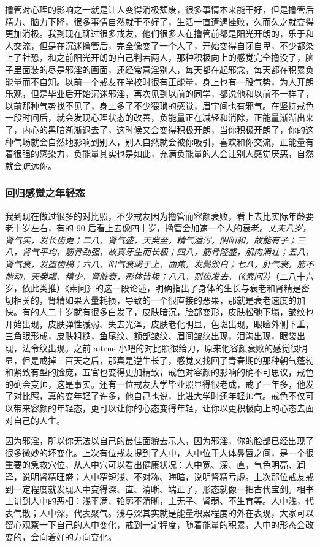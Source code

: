 撸管对心理的影响之一就是让人变得消极颓废，很多事情本来能干好，但是撸管后精力、脑力下降，很多事情自然就干不好了，生活一直遭遇挫败，久而久之就变得更加消极。我到现在聊过很多戒友，他们很多人在撸管前都是阳光开朗的，乐于和人交流，但是在沉迷撸管后，完全像变了一个人了，开始变得自闭自卑，不少都染上了社恐，和之前阳光开朗的自己判若两人，那种积极向上的感觉完全撸没了，脑子里面装的尽是邪淫的画面，还经常意淫别人，每天都在起邪念，每天都在积累负能量而不自知。以前一个戒友在学校时很有正能量，身上也有一股气势，为人开朗乐观，但是毕业后开始沉迷邪淫，再次见到以前的同学，都说他和以前不一样了，以前那种气势找不见了，身上多了不少猥琐的感觉，眉宇间也有邪气。在坚持戒色一段时间后，就会发现心理状态的改善，负能量正在减轻和消除，正能量渐渐出来了，内心的黑暗渐渐退去了，这时候又会变得积极开朗，当你积极开朗了，你的这种气场就会自然地影响到别人，别人自然就会被你吸引，喜欢和你交流，正能量有着很强的感染力，负能量其实也是如此，充满负能量的人会让别人感觉厌恶，自然就会疏远你。

\subsubsection{回归感觉之年轻态}

我到现在做过很多的对比照，不少戒友因为撸管而容颜衰败，看上去比实际年龄要老十岁左右，有的 90 后看上去像四十岁，撸管会加速一个人的衰老。\textit{丈夫八岁，肾气实，发长齿更；二八，肾气盛，天癸至，精气溢泻，阴阳和，故能有子；三八，肾气平均，筋骨劲强，故真牙生而长极；四八，筋骨隆盛，肌肉满壮；五八，肾气衰，发堕齿槁；六八，阳气衰竭于上，面焦，发鬓颁白；七八，肝气衰，筋不能动，天癸竭，精少，肾脏衰，形体皆极；八八，则齿发去。（《素问》）}（二八十六岁，依此类推）《素问》的这一段论述，明确指出了身体的生长与衰老和肾精是密切相关的，肾精如果大量耗损，导致的一个很直接的恶果，那就是衰老速度的加快。有的人二十岁就有很多白发了，皮肤暗沉，脸部变形，皮肤松弛下塌，皱纹也开始出现，皮肤弹性减弱、失去光泽，皮肤老化明显，色斑出现，眼睑外侧下垂，三角眼形成，皮肤粗糙，鱼尾纹、额部皱纹、眉间皱纹出现，泪沟出现，眼袋出现，法令纹出现。之前 aitrue 小吧的对比照很给力，原来他容颜衰败的感觉很明显，但是戒掉三百天之后，那真是逆生长了，感觉又找回了青春期的那种朝气蓬勃和紧致有型的脸庞，五官也变得更加精致，戒色对容颜的影响的确不可思议，戒色的确会变帅，这是事实。还有一位戒友大学毕业照显得很老成，戒了一年多，他发了对比照，真的变年轻了许多，他自己也说，比进大学时还年轻帅气。戒色不仅可以带来容颜的年轻态，更可以让你的心态变得年轻，让你以更积极向上的心态去面对自己的人生。

因为邪淫，所以你无法以自己的最佳面貌去示人，因为邪淫，你的脸部已经出现了很多微妙的坏变化。上次有位戒友提到了人中，人中位于人体鼻唇之间，是一个很重要的急救穴位，从人中穴可以看出健康状况：人中宽、深、直，气色明亮、润泽，说明肾精旺盛；人中窄短浅、不对称、晦暗，说明肾精亏虚。上次那位戒友戒到一定程度就发现人中变得深、直、清晰、端正了，形态就像一把古代宝剑。相书上讲到人中的恶相：浅平满、轮廓不清晰，主无子、肾弱、不生育等。人中浅，代表气散；人中深，代表聚气。浅与深其实就是能量积累程度的外在表现，大家可以留心观察一下自己的人中变化，戒到一定程度，随着能量的积累，人中的形态会改变的，会向着好的方向变化。

